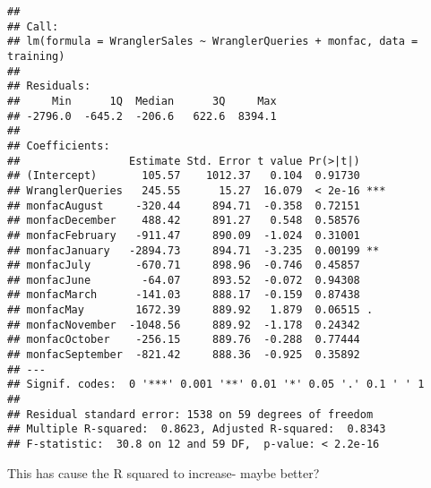 \documentclass[]{article}
\newenvironment{Shaded}{\begin{snugshade}}{\end{snugshade}}
\newcommand{\KeywordTok}[1]{\textcolor[rgb]{0.13,0.29,0.53}{\textbf{#1}}}
\newcommand{\DataTypeTok}[1]{\textcolor[rgb]{0.13,0.29,0.53}{#1}}
\newcommand{\DecValTok}[1]{\textcolor[rgb]{0.00,0.00,0.81}{#1}}
\newcommand{\StringTok}[1]{\textcolor[rgb]{0.31,0.60,0.02}{#1}}
\newcommand{\CommentTok}[1]{\textcolor[rgb]{0.56,0.35,0.01}{\textit{#1}}}
\newcommand{\OperatorTok}[1]{\textcolor[rgb]{0.81,0.36,0.00}{\textbf{#1}}}
\newcommand{\NormalTok}[1]{#1}
\begin{document}
\begin{verbatim}
## 
## Call:
## lm(formula = WranglerSales ~ WranglerQueries + monfac, data = training)
## 
## Residuals:
##     Min      1Q  Median      3Q     Max 
## -2796.0  -645.2  -206.6   622.6  8394.1 
## 
## Coefficients:
##                 Estimate Std. Error t value Pr(>|t|)    
## (Intercept)       105.57    1012.37   0.104  0.91730    
## WranglerQueries   245.55      15.27  16.079  < 2e-16 ***
## monfacAugust     -320.44     894.71  -0.358  0.72151    
## monfacDecember    488.42     891.27   0.548  0.58576    
## monfacFebruary   -911.47     890.09  -1.024  0.31001    
## monfacJanuary   -2894.73     894.71  -3.235  0.00199 ** 
## monfacJuly       -670.71     898.96  -0.746  0.45857    
## monfacJune        -64.07     893.52  -0.072  0.94308    
## monfacMarch      -141.03     888.17  -0.159  0.87438    
## monfacMay        1672.39     889.92   1.879  0.06515 .  
## monfacNovember  -1048.56     889.92  -1.178  0.24342    
## monfacOctober    -256.15     889.76  -0.288  0.77444    
## monfacSeptember  -821.42     888.36  -0.925  0.35892    
## ---
## Signif. codes:  0 '***' 0.001 '**' 0.01 '*' 0.05 '.' 0.1 ' ' 1
## 
## Residual standard error: 1538 on 59 degrees of freedom
## Multiple R-squared:  0.8623, Adjusted R-squared:  0.8343 
## F-statistic:  30.8 on 12 and 59 DF,  p-value: < 2.2e-16
\end{verbatim}

This has cause the R squared to increase- maybe better?

\begin{Shaded}
\end{Shaded}
\end{document}
